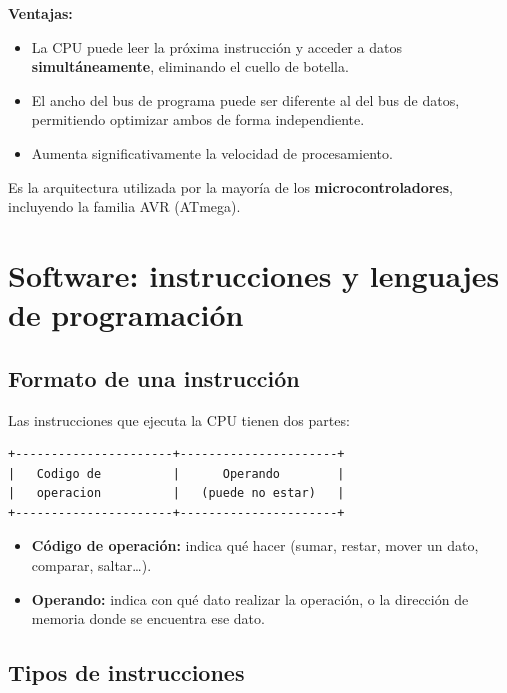 \textbf{Ventajas:}
\begin{itemize}
  \item La CPU puede leer la próxima instrucción y acceder a datos \textbf{simultáneamente}, eliminando el cuello de botella.
  \item El ancho del bus de programa puede ser diferente al del bus de datos, permitiendo optimizar ambos de forma independiente.
  \item Aumenta significativamente la velocidad de procesamiento.
\end{itemize}

Es la arquitectura utilizada por la mayoría de los \textbf{microcontroladores}, incluyendo la familia AVR (ATmega).

\section{Software: instrucciones y lenguajes de programación}

\subsection{Formato de una instrucción}

Las instrucciones que ejecuta la CPU tienen dos partes:

\begin{lstlisting}[style=estilo-pseudocode]
+----------------------+----------------------+
|   Codigo de          |      Operando        |
|   operacion          |   (puede no estar)   |
+----------------------+----------------------+
\end{lstlisting}

\begin{itemize}
  \item \textbf{Código de operación:} indica qué hacer (sumar, restar, mover un dato, comparar, saltar\ldots).
  \item \textbf{Operando:} indica con qué dato realizar la operación, o la dirección de memoria donde se encuentra ese dato.
\end{itemize}

\subsection{Tipos de instrucciones}

